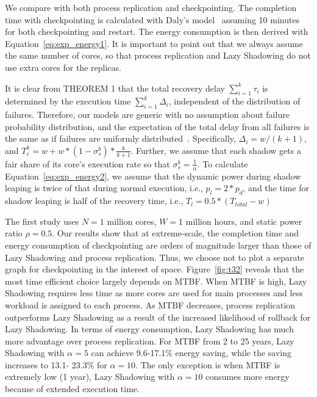 We compare with both process replication and checkpointing. %
The completion time with checkpointing is calculated with Daly's model~\cite{daly_fgcs_2006} assuming 10 minutes for both checkpointing and restart. The energy consumption is then derived with Equation~\ref{eq:exp_energy1}. It is important to point out that we always assume the same number of cores, so that process replication and Lazy Shadowing do not use extra cores for the replicas. 

It is clear from THEOREM 1 that the total recovery delay $\sum_{i=1}^k\tau_i$ is determined by the execution time $\sum_{i=1}^k\Delta_i$, independent of the distribution of failures. 
Therefore, our models are generic with no assumption about failure probability distribution, and the expectation of the total delay from all failures is the same as if failures are uniformly distributed~\cite{daly_fgcs_2006}. Specifically, $\Delta_i = w/(k+1)$, and $T_c^k = w + w*(1-\sigma_s^b)*\frac{k}{k+1}$. Further, we assume that each shadow gets a fair share of its core's execution rate so that $\sigma_s^b = \frac{1}{\alpha}$.
To calculate Equation~\ref{eq:exp_energy2}, we assume that the dynamic power during shadow leaping is twice of that during normal execution, i.e., $p_{l}=2*p_d$, and the time for shadow leaping is half of the recovery time, i.e., $T_l=0.5*(T_{total} - w)$ 

The first study uses $N=1$ million cores, %
$W=1$ million hours, and static power ratio $\rho=0.5$.
Our results show that at extreme-scale, the completion time and energy consumption of checkpointing are orders of magnitude larger than those of Lazy Shadowing and process replication. Thus, we choose not to plot a separate graph for checkpointing in the interest of space. 
Figure~\ref{fig:t32} reveals that the most time efficient choice largely depends on MTBF. 
When MTBF is high, Lazy Shadowing requires less time as more cores are used for main processes and less workload is assigned to each process. As MTBF decreases, process replication outperforms Lazy Shadowing as a result of the increased likelihood of rollback for Lazy Shadowing.
In terms of energy consumption, Lazy Shadowing has much more advantage over process replication. For MTBF from 2 to 25 years, Lazy Shadowing with $\alpha=5$ can achieve 9.6-17.1\% energy saving, while the saving increases to 13.1- 23.3\% for $\alpha=10$. The only exception is when MTBF is extremely low (1 year), Lazy Shadowing with $\alpha=10$ consumes more energy because of extended execution time.

